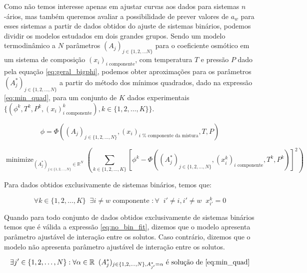 \documentclass[
	12pt,				%
	openright,
	twoside,
	a4paper,			%
	english,			%
	french,				%
	spanish,			%
	brazil				%
	]{abntex2}
\DeclareMathOperator*{\minimize}{minimize}
\begin{document}
Como não temos interesse apenas em ajustar curvas aos dados para sistemas
$n$-ários, mas também queremos avaliar a possibilidade de prever valores de
$a_w$ para esses sistemas a partir de dados obtidos do ajuste de sistemas
binários, podemos dividir os modelos estudados em dois grandes grupos. Sendo um
modelo termodinâmico a $N$ parâmetros $(A_j)_{j \in \{1, 2, \ldots N\}}$ para o
coeficiente osmótico em um sistema de composição $(x_i)_\text{$i$ componente}$,
com temperatura $T$ e pressão $P$ dado pela equação \ref{eq:geral_bigphi},
podemos obter aproximações para os parâmetros $(A_j^*)_{j \in \{1, 2, \ldots, N\}}$
a partir do método dos mínimos quadrados, dado na expressão \ref{eq:min_quad},
para um conjunto de $K$ dados experimentais $\{(\phi^k, T^k, P^k,%
	(x_i)^k_\text{$i$ componente}), k \in \{1,2,\ldots,K\}\}$.

\begin{equation}
	\label{eq:geral_bigphi}
	\phi = \Phi((A_j)_{j \in \{1, 2, \ldots, N\}}, (x_i)_\text{$i$ %
		componente da mistura}, T, P)
\end{equation}

\begin{equation}
	\label{eq:min_quad}
	\minimize_{(A_j^*)_{j \in \{1,2,\ldots,N\}} \in \mathbb{R}^N}%
	\left(\sum_{k \in \{1,2,\ldots,K\}}\left[\phi^k - \Phi((A^*_j)_{j%
	\in \{1, 2, \ldots, N\}}, (x^k_i)_\text{$i$ componente},%
	T^k, P^k)\right]^2\right)
\end{equation}

Para dados obtidos exclusivamente de sistemas binários, temos que:

\begin{equation}
	\forall k \in \{1,2,\ldots,K\} \;\; \exists i \neq w%
	\text{ componente } : \forall \;\; i' \neq i, i' \neq w\;\; x^k_{i'} = 0
\end{equation}

Quando para todo conjunto de dados obtidos exclusivamente de sistemas binários
temos que é válida a expressão \ref{eq:no_bin_fit},
dizemos que o modelo apresenta parâmetro ajustável de interação entre os
solutos. Caso contrário, dizemos que o modelo não apresenta parâmetro
ajustável de interação entre os solutos.

\begin{equation}
	\label{eq:no_bin_fit}
	\exists j' \in \{1,2,\ldots,N\} : \forall \alpha \in \mathbb{R}\;\;%
	(A_j^*)_{j \in \{1,2,\ldots,N\}, A_{j'}^* = \alpha}%
	\text{ é solução de \ref{eq:min_quad}}
\end{equation}
\end{document}
